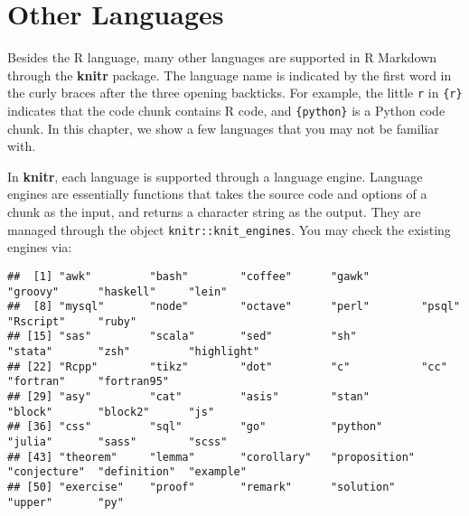 \documentclass[
  11pt,
]{krantz}
\newenvironment{Shaded}{\begin{snugshade}}{\end{snugshade}}
\newcommand{\KeywordTok}[1]{\textcolor[rgb]{0.27,0.27,0.27}{\textbf{#1}}}
\newcommand{\NormalTok}[1]{#1}
\newcommand{\OperatorTok}[1]{\textcolor[rgb]{0.43,0.43,0.43}{\textbf{#1}}}
\begin{document}
\hypertarget{other-languages}{%
\chapter{Other Languages}\label{other-languages}}

Besides the R language, many other languages are supported in R Markdown through the \textbf{knitr} package. The language name is indicated by the first word in the curly braces after the three opening backticks. For example, the little \texttt{r} in \texttt{\textasciigrave{}\textasciigrave{}\textasciigrave{}\{r\}} indicates that the code chunk contains R code, and \texttt{\textasciigrave{}\textasciigrave{}\textasciigrave{}\{python\}} is a Python code chunk. In this chapter, we show a few languages that you may not be familiar with.

In \textbf{knitr}, each language is supported through a language engine. Language engines are essentially functions that takes the source code and options of a chunk as the input, and returns a character string as the output. They are managed through the object \texttt{knitr::knit\_engines}. You may check the existing engines via:

\begin{Shaded}
\end{Shaded}

\begin{verbatim}
##  [1] "awk"         "bash"        "coffee"      "gawk"        "groovy"      "haskell"     "lein"       
##  [8] "mysql"       "node"        "octave"      "perl"        "psql"        "Rscript"     "ruby"       
## [15] "sas"         "scala"       "sed"         "sh"          "stata"       "zsh"         "highlight"  
## [22] "Rcpp"        "tikz"        "dot"         "c"           "cc"          "fortran"     "fortran95"  
## [29] "asy"         "cat"         "asis"        "stan"        "block"       "block2"      "js"         
## [36] "css"         "sql"         "go"          "python"      "julia"       "sass"        "scss"       
## [43] "theorem"     "lemma"       "corollary"   "proposition" "conjecture"  "definition"  "example"    
## [50] "exercise"    "proof"       "remark"      "solution"    "upper"       "py"
\end{verbatim}
\end{document}
